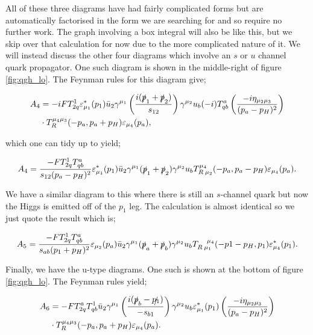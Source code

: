 All of these three diagrams have had fairly complicated forms but are automatically factorised in the form we are searching for and so require no further work. The graph involving a box integral will also be like this, but we skip over that calculation for now due to the more complicated nature of it. We will instead discuss the other four diagrams which involve an $s$ or $u$ channel quark propagator. One such diagram is shown in the middle-right of figure \ref{fig:qgh_lo}. The Feynman rules for this diagram give;

\begin{equation}
\begin{split}
A_4 &= -i FT^{1}_{2q} \varepsilon_{\mu_1}^*(p_1) \bar{u}_2 \gamma^{\mu_1}  \left(\frac{i(\slashed{p}_1+\slashed{p}_2)}{s_{12}}\right) \gamma^{\mu_2}u_b (-i)T^{a}_{qb} \left(\frac{-i \eta_{\mu_2 \mu_3}}{(p_a-p_H)^2} \right)\\
&\cdot T_R^{\mu_4 \mu_3}(-p_a,p_a+p_H)\varepsilon_{\mu_4}(p_a),
\end{split}
\end{equation}

which one can tidy up to yield;

\begin{equation}
A_4 = \frac{- F T^1_{2q}T^a_{qb}}{s_{12}(p_a-p_H)^2} \varepsilon^*_{\mu_1}(p_1) \bar{u}_2 \gamma^{\mu_1}(\slashed{p}_1+\slashed{p}_2)\gamma^{\mu_2}u_b T_{R \hspace{2pt} \mu_2}^{\mu_4}(-p_a,p_a-p_H)\varepsilon_{\mu_4}(p_a).
\end{equation}


We have a similar diagram to this where there is still an $s$-channel quark but now the Higgs is emitted off of the $p_1$ leg. The calculation is almost identical so we just quote the result which is;

\begin{equation}
A_5 = \frac{- F T^1_{2q}T^a_{qb}}{s_{ab}(p_1+p_H)^2} \varepsilon_{\mu_2}(p_a) \bar{u}_2 \gamma^{\mu_1}(\slashed{p}_a+\slashed{p}_b)\gamma^{\mu_2}u_b T_{R \hspace{2pt}  \mu_1}^{\hspace{10pt} \mu_4}(-p1-p_H,p_1)\varepsilon_{\mu_4}^*(p_1).
\end{equation}

Finally, we have the u-type diagrams. One such is shown at the bottom of figure \ref{fig:qgh_lo}. The Feynman rules yield;

\begin{equation}
\begin{split}
A_6 &=-FT^a_{2q}T^1_{qb} \bar{u}_2 \gamma^{\mu_1}\left(\frac{i(\slashed{p}_b - \slashed{p_1})}{-s_{b1}} \right)\gamma^{\mu_2}u_b \varepsilon_{\mu_1}^*(p_1)\left(\frac{-i \eta_{\mu_2 \mu_3}}{(p_a-p_H)^2}\right)\\
& \cdot T_R^{\mu_4 \mu_3}(-p_a,p_a+p_H)\varepsilon_{\mu_4}(p_a).
\end{split}
\end{equation}

